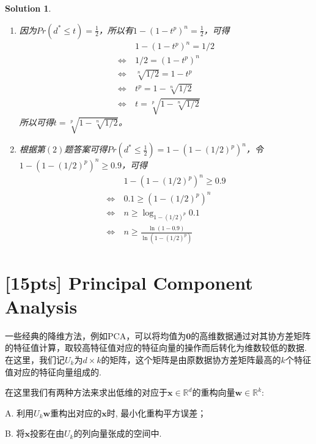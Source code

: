 \documentclass[a4paper,UTF8]{article}
\numberwithin{equation}{section}
\newtheorem*{mySol}{Solution}
\begin{document}
\begin{mySol}
\begin{enumerate}[(1)]
\item 
因为$Pr(d^*\leq t)=\frac{1}{2}$，所以有$1 - (1-t^p)^n = \frac{1}{2}$，可得
\begin{equation}
\begin{aligned}
&1 - (1-t^p)^n = 1/2\\
\Leftrightarrow\ &1/2 = (1-t^p)^n\\
\Leftrightarrow\ &\sqrt[n]{1/2} = 1-t^p\\
\Leftrightarrow\ &t^p = 1- \sqrt[n]{1/2}\\
\Leftrightarrow\ &t = \sqrt[p]{1- \sqrt[n]{1/2}}
\end{aligned}
\end{equation}
所以可得$t = \sqrt[p]{1- \sqrt[n]{1/2}}$。
\item 
根据第$(2)$题答案可得$Pr(d^* \leq \frac{1}{2}) = 1 - (1-(1/2)^p)^n$，令$1 - (1-(1/2)^p)^n \geq 0.9$，可得
\begin{equation}
\begin{aligned}
&1 - (1-(1/2)^p)^n \geq 0.9\\
\Leftrightarrow\ &0.1 \geq (1-(1/2)^p)^n\\
\Leftrightarrow\ &n \geq \log_{1-(1/2)^p}0.1\\
\Leftrightarrow\ &n \geq \frac{\ln (1-0.9)}{\ln (1-(1/2)^p)}
\end{aligned}
\end{equation}
\end{enumerate}
\end{mySol}
\newpage

\section{[15pts] Principal Component Analysis}
一些经典的降维方法，例如PCA，可以将均值为$\mathbf{0}$的高维数据通过对其协方差矩阵的特征值计算，取较高特征值对应的特征向量的操作而后转化为维数较低的数据. 在这里，我们记$U_k$为$d\times k$的矩阵，这个矩阵是由原数据协方差矩阵最高的$k$个特征值对应的特征向量组成的. 

在这里我们有两种方法来求出低维的对应于$\mathbf{x}\in \mathbb{R}^d$的重构向量$\mathbf{w}\in \mathbb{R}^k$:

A. 利用$U_k\mathbf{w}$重构出对应的$\mathbf{x}$时, 最小化重构平方误差；

B. 将$\mathbf{x}$投影在由$U_k$的列向量张成的空间中.
\end{document}
